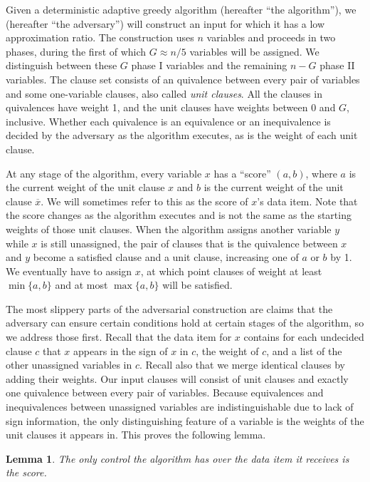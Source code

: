 \documentclass[11pt,letter]{article}
\newtheorem{lemma}[theorem]{Lemma}
\numberwithin{theorem}{section}
\newcommand{\ol}{\overline}
\begin{document}
Given a deterministic adaptive greedy algorithm (hereafter ``the algorithm''),
we (hereafter ``the adversary'')
will construct an input for which it has a low approximation ratio.
The construction uses $n$ variables and proceeds in two phases,
during the first of which $G \approx n/5$ variables will be assigned.
We distinguish between these $G$ phase I variables
and the remaining $n-G$ phase II variables.
The clause set consists of an quivalence between every pair of variables
and some one-variable clauses,
also called \emph{unit clauses}.
All the clauses in quivalences have weight 1,
and the unit clauses have weights between $0$ and $G$, inclusive.
Whether each quivalence is an equivalence or an inequivalence
is decided by the adversary as the algorithm executes,
as is the weight of each unit clause.

At any stage of the algorithm, every variable $x$
has a ``score'' $(a,b)$,
where $a$ is the current weight of the unit clause $x$
and $b$ is the current weight of the unit clause $\ol{x}$.
We will sometimes refer to this as the score of $x$'s data item.
Note that the score changes as the algorithm executes
and is not the same as the starting weights of those unit clauses.
When the algorithm assigns another variable $y$
while $x$ is still unassigned,
the pair of clauses that is the quivalence between $x$ and $y$
become a satisfied clause and a unit clause,
increasing one of $a$ or $b$ by 1.
We eventually have to assign $x$,
at which point clauses of weight at least $\min\{a,b\}$
and at most $\max\{a,b\}$ will be satisfied.

The most slippery parts of the adversarial construction
are claims that the adversary can ensure certain conditions hold
at certain stages of the algorithm, so we address those first.
Recall that the data item for $x$ contains
for each undecided clause $c$ that $x$ appears in
the sign of $x$ in $c$, the weight of $c$,
and a list of the other unassigned variables in $c$.
Recall also that we merge identical clauses by adding their weights.
Our input clauses will consist of unit clauses
and exactly one quivalence between every pair of variables.
Because equivalences and inequivalences between unassigned variables
are indistinguishable due to lack of sign information,
the only distinguishing feature of a variable
is the weights of the unit clauses it appears in.
This proves the following lemma.

\begin{lemma}\label{lemma:score}
  The only control the algorithm has over the data item it receives
  is the score.
\end{lemma}
\end{document}
